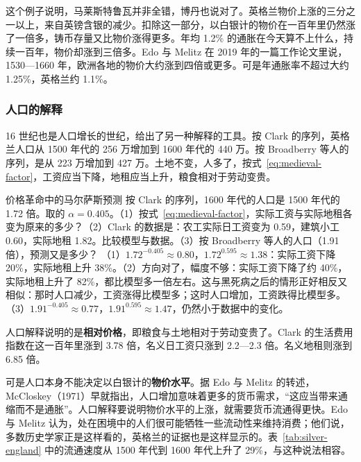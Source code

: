 这个例子说明，马莱斯特鲁瓦并非全错，博丹也说对了。英格兰物价上涨的三分之一以上，来自英镑含银的减少。扣除这一部分，以白银计的物价在一百年里仍然涨了一倍多，铸币存量又比物价涨得更多。年均 1.2\% 的通胀在今天算不上什么，持续一百年，物价却涨到三倍多。Edo 与 Melitz 在 2019 年的一篇工作论文里说，1530—1660 年，欧洲各地的物价大约涨到四倍或更多。可是年通胀率不超过大约 1.25\%，英格兰约 1.1\%\cite{em2019}。

\subsubsection{人口的解释}
16 世纪也是人口增长的世纪，给出了另一种解释的工具。按 Clark 的序列，英格兰人口从 1500 年代的 256 万增加到 1600 年代的 440 万。按 Broadberry 等人的序列，是从 223 万增加到 427 万\cite{clark2010,broadberry2015}。土地不变，人多了，按式~\eqref{eq:medieval-factor}，工资应当下降，地租应当上升，粮食相对于劳动变贵。

\begin{example}{价格革命中的马尔萨斯预测}\label{ex:silver-malthus}
按 Clark 的序列，1600 年代的人口是 1500 年代的 1.72 倍。取的 $\alpha=0.405$。（1）按式~\eqref{eq:medieval-factor}，实际工资与实际地租各变为原来的多少？（2）Clark 的数据是：农工实际日工资变为 0.59，建筑小工 0.60，实际地租 1.82。比较模型与数据。（3）按 Broadberry 等人的人口（1.91 倍），预测又是多少？
\solution （1）$1.72^{-0.405}\approx0.80$，$1.72^{0.595}\approx1.38$：实际工资下降 20\%，实际地租上升 38\%。（2）方向对了，幅度不够：实际工资下降了约 40\%，实际地租上升了 82\%，都比模型多一倍左右。这与黑死病之后的情形正好相反又相似：那时人口减少，工资涨得比模型多；这时人口增加，工资跌得比模型多。（3）$1.91^{-0.405}\approx0.77$，$1.91^{0.595}\approx1.47$，仍然小于数据中的变化。
\end{example}

人口解释说明的是\textbf{相对价格}，即粮食与土地相对于劳动变贵了。Clark 的生活费用指数在这一百年里涨到 3.78 倍，名义日工资只涨到 2.2—2.3 倍。名义地租则涨到 6.85 倍\cite{clark2010}。

可是人口本身不能决定以白银计的\textbf{物价水平}。据 Edo 与 Melitz 的转述，McCloskey（1971）早就指出，人口增加意味着更多的货币需求，“这应当带来通缩而不是通胀”\cite{em2019}。人口解释要说明物价水平的上涨，就需要货币流通得更快。Edo 与 Melitz 认为，处在困境中的人们很可能牺牲一些流动性来维持消费；他们说，多数历史学家正是这样看的，英格兰的证据也是这样显示的\cite{em2019}。表~\ref{tab:silver-england} 中的流通速度从 1500 年代到 1600 年代上升了 29\%，与这种说法相容。

